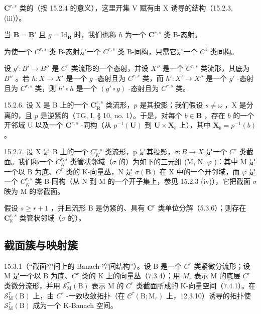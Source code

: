 \(\mathbf{C}^{r,s}\) 类的（按 15.2.4 的意义），这里开集 V 赋有由 X 诱导的结构（15.2.3, (iii)）。

当 \(\mathbf{B} = \mathbf{B}'\) 且 \(g = \mathrm{Id}_{\mathbf{B}}\) 时，我们也称 \(h\) 为一个 \(\mathbf{C}^{r,s}\) 类 B-态射。

为使一个 \(C^{r,s}\) 类 B-态射是一个 \(C^{r,s}\) 类 B-同构，只需它是一个 \(C^{1}\) 类同构。

设 \(g': B' \to B''\) 是 \(C^r\) 类流形的一个态射，并设 \(X''\) 是一个 \(C^{r,s}\) 类流形，其底为 \(B''\) 。若 \(h: X \to X'\) 是一个 \(g\) -态射且为 \(C^{r,s}\) 类，而 \(h': X' \to X''\) 是一个 \(g'\) -态射且为 \(C^{r,s}\) 类，则 \(h' \circ h\) 是一个 \((g' \circ g)\) -态射且为 \(C^{r,s}\) 类。

15.2.6. 设 X 是 B 上的一个 \(\mathbf{C}_{\mathbf{R}}^{r,s}\) 类流形，\(p\) 是其投影；我们假设 \(s \neq \omega\) ，X 是分离的，且 \(p\) 是逆紧的（TG, I, § 10, no. 1）。于是，对每个 \(b \in \mathbf{B}\) ，存在 \(b\) 的一个开邻域 U 以及一个 \(\mathbf{C}^{r,s}\) -同构（从 \(p^{-1}(\mathbf{U})\) 到 \(\mathbf{U} \times \mathbf{X}_b\) 上），其中 \(\mathbf{X}_b = p^{-1}(b)\) 。

15.2.7. 设 X 是 B 上的一个 \(C_{K}^{r,s}\) 类流形，p 是其投影，\(\sigma: B \to X\) 是一个 \(C^{r}\) 类截面。我们称一个 \(C_{K}^{r,s}\) 类管状邻域（\(\sigma\) 的）为如下的三元组 (M, N, \(\varphi\) )：其中 M 是一个以 B 为底、\(C^{r}\) 类的 K-向量丛，N 是 \(\sigma(\mathbf{B})\) 在 X 中的一个开邻域，而 \(\varphi\) 是一个 \(C_{K}^{r,s}\) 类 B-同构（从 N 到 M 的一个开子集上，参见 15.2.3 (iv)），它把截面 \(\sigma\) 映为 M 的零截面。

假设 \(s \geqslant r + 1\) ，并且流形 B 是仿紧的、具有 \(\mathbf{C}^{r}\) 类单位分解（5.3.6）；则存在 \(\mathbf{C}_{\mathbb{K}}^{r,s}\) 类管状邻域（\(\sigma\) 的）。

\subsection{截面簇与映射簇}

15.3.1（“截面空间上的 Banach 空间结构”）。设 B 是一个 \(C^{r}\) 类紧微分流形；设 M 是一个以 B 为底、\(C^{r}\) 类的 K 上的向量丛（7.3.4）；用 \(M_{r}\) 表示 M 的底层 \(C^{r}\) 类微分流形，并用 \(\mathcal{S}_{\mathrm{M}}^{\tau}(\mathrm{B})\) 表示 M 的 \(C^{r}\) 类截面所成的 K-向量空间（7.4.1）。在 \(\mathcal{S}_{\mathrm{M}}^{\tau}(\mathrm{B})\) 上，由 \(C^{r}\) -一致收敛拓扑（在 \(\mathcal{C}^{\tau}(\mathrm{B};\mathrm{M}_{r})\) 上，12.3.10）诱导的拓扑使 \(\mathcal{S}_{\mathrm{M}}^{\tau}(\mathrm{B})\) 成为一个 K-Banach 空间。

